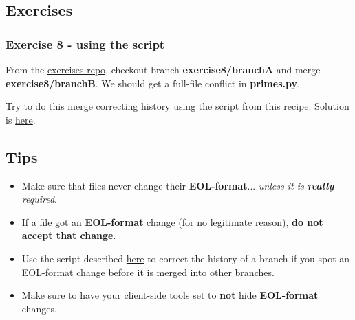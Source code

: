 \subsection{Exercises}

\subsubsection{Exercise 8 - using the script}

From the \hyperref[exercises_repo]{exercises repo}, checkout branch {\bf exercise8/branchA} and merge {\bf exercise8/branchB}. We
should get a full-file conflict in {\bf primes.py}.

Try to do this merge correcting history using the script from \hyperref[correct_eol_history]{this recipe}.
Solution is \hyperref[exercise08]{here}.

\subsection{Tips}
\begin{itemize}
	\item Make sure that files never change their {\bf EOL-format}... {\it unless it is {\bf really} required}.
	\item If a file got an {\bf EOL-format} change (for no legitimate reason), {\bf do not accept that change}.
	\item Use the script described \hyperref[correct_eol_history]{here} to correct the history of a branch if you
	spot an EOL-format change before it is merged into other branches.
	\item Make sure to have your client-side tools set to {\bf not} hide {\bf EOL-format} changes.
\end{itemize}
